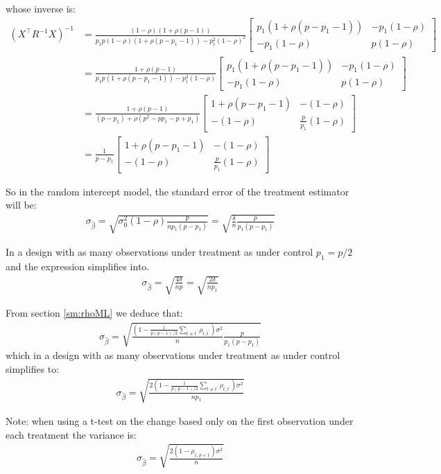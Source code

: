 \documentclass[12pt]{article}
\newcommand\trans[1]{{#1}^\intercal}%
\begin{document}
whose inverse is:
\begin{align*}
\left(\trans{X} R^{-1} X\right)^{-1} &= \frac{(1-\rho)(1+\rho(p-1))}{p_1 p (1-\rho)(1+\rho (p-p_1-1)) - p^2_1(1-\rho)^2} \begin{bmatrix} p_1(1+\rho (p-p_1-1))
                  & -p_1(1-\rho)
                  \\ -p_1(1-\rho)
                  & p(1-\rho)
\end{bmatrix} \\
&= \frac{1+\rho(p-1)}{p_1 p (1+\rho (p-p_1-1)) - p^2_1(1-\rho)} \begin{bmatrix} p_1(1+\rho (p-p_1-1))
                  & -p_1(1-\rho)
                  \\ -p_1(1-\rho)
                  & p(1-\rho)
\end{bmatrix} \\
&= \frac{1+\rho(p-1)}{(p - p_1) + \rho (p^2-p p_1-p+p_1)} \begin{bmatrix} 1+\rho (p-p_1-1)
                  & -(1-\rho)
                  \\ -(1-\rho)
                  & \frac{p}{p_1}(1-\rho)
\end{bmatrix} \\
&= \frac{1}{p-p_1} \begin{bmatrix} 1+\rho (p-p_1-1)
                  & -(1-\rho)
                  \\ -(1-\rho)
                  & \frac{p}{p_1}(1-\rho)
\end{bmatrix}   
\end{align*}

\clearpage

So in the random intercept model, the standard error of the treatment
estimator will be:
\begin{align*}
\sigma_{\widehat{\beta}} = \sqrt{\sigma_0^2(1-\rho) \frac{p}{n p_1(p-p_1)}}=\sqrt{\frac{\delta}{n} \frac{p}{p_1(p-p_1)}}
\end{align*}

In a design with as many observations under treatment as under control \(p_1=p/2\) and the expression simplifies into.
\begin{align*}
\sigma_{\widehat{\beta}} = \sqrt{\frac{4\delta}{np}} = \sqrt{\frac{2\delta}{np_1}}
\end{align*}

From section \ref{sm:rhoML} we deduce that:
\begin{align*}
\sigma_{\widehat{\beta}} = \sqrt{\frac{\left(1-\frac{1}{p(p-1)/2}\sum_{t \neq t^{\prime}} \rho_{t,t^{\prime}}\right) \sigma^2}{n}\frac{p}{p_1(p-p_1)}}
\end{align*}
which in a design with as many observations under treatment as under control simplifies to:
\begin{align*}
\sigma_{\widehat{\beta}} = \sqrt{\frac{2\left(1-\frac{1}{p(p-1)/2}\sum_{t \neq t^{\prime}} \rho_{t,t^{\prime}}\right) \sigma^2}{n p_1}}
\end{align*}

Note: when using a t-test on the change based only on the first
observation under each treatment the variance is:
\begin{align*}
\sigma_{\widehat{\beta}} = \sqrt{\frac{2(1-\rho_{1,p+1}) \sigma^2}{n}}
\end{align*}

\clearpage
\end{document}
